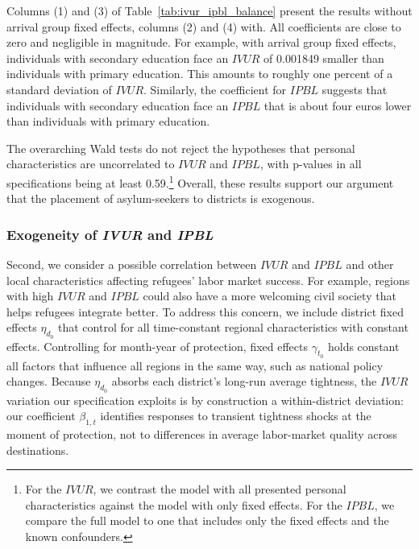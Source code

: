 Columns (1) and (3) of Table~\ref{tab:ivur_ipbl_balance} present the results without arrival group fixed effects, columns (2) and (4) with. All coefficients are close to zero and negligible in magnitude. For example, with arrival group fixed effects, individuals with secondary education face an $IVUR$ of 0.001849 smaller than individuals with primary education. This amounts to roughly one percent of a standard deviation of $IVUR$. Similarly, the coefficient for $IPBL$ suggests that individuals with secondary education face an $IPBL$ that is about four euros lower than individuals with primary education.

The overarching Wald tests do not reject the hypotheses that personal characteristics are uncorrelated to $IVUR$ and $IPBL$, with p-values in all specifications being at least 0.59.\footnote{For the $IVUR$, we contrast the model with all presented personal characteristics against the model with only fixed effects. For the $IPBL$, we compare the full model to one that includes only the fixed effects and the known confounders.} Overall, these results support our argument that the placement of asylum-seekers to districts is exogenous.

\subsubsection{Exogeneity of \textit{IVUR} and \textit{IPBL}} \label{identification_treatments}

Second, we consider a possible correlation between $IVUR$ and $IPBL$ and other local characteristics affecting refugees' labor market success. For example, regions with high $IVUR$ and $IPBL$ could also have a more welcoming civil society that helps refugees integrate better. To address this concern, we include district fixed effects $\eta_{d_0}$ that control for all time-constant regional characteristics with constant effects. Controlling for month-year of protection, fixed effects $\gamma_{t_0}$ holds constant all factors that influence all regions in the same way, such as national policy changes. Because $\eta_{d_0}$ absorbs each district's long-run average tightness, the $IVUR$ variation our specification exploits is by construction a within-district deviation: our coefficient $\beta_{1,t}$ identifies responses to transient tightness shocks at the moment of protection, not to differences in average labor-market quality across destinations.

